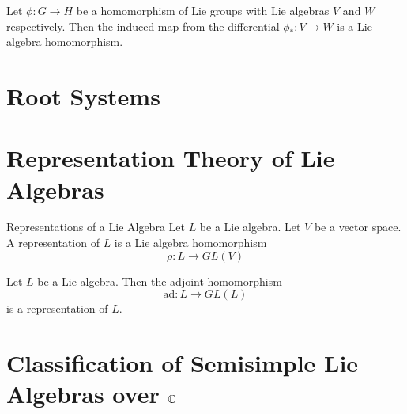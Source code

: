 \documentclass[a4paper]{article}
\begin{document}
\begin{prp}{}{} Let $\phi:G\to H$ be a homomorphism of Lie groups with Lie algebras $V$ and $W$ respectively. Then the induced map from the differential $\phi_\ast:V\to W$ is a Lie algebra homomorphism. 
\end{prp}

\pagebreak
\section{Root Systems}

\pagebreak
\section{Representation Theory of Lie Algebras}
\begin{defn}{Representations of a Lie Algebra}{} Let $L$ be a Lie algebra. Let $V$ be a vector space. A representation of $L$ is a Lie algebra homomorphism $$\rho:L\to GL(V)$$
\end{defn}

\begin{lmm}{}{} Let $L$ be a Lie algebra. Then the adjoint homomorphism $$\text{ad}:L\to GL(L)$$ is a representation of $L$. 
\end{lmm}

\pagebreak
\section{Classification of Semisimple Lie Algebras over $\mathbb{C}$}
\end{document}
